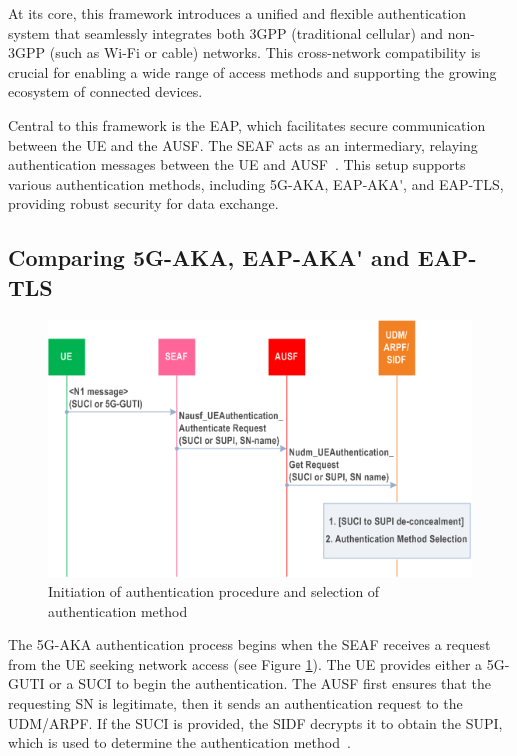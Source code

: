 At its core, this framework introduces a unified and flexible authentication system that seamlessly integrates both \ac{3GPP} (traditional cellular) and non-\ac{3GPP} (such as Wi-Fi or cable) networks. This cross-network compatibility is crucial for enabling a wide range of access methods and supporting the growing ecosystem of connected devices.

Central to this framework is the \ac{EAP}, which facilitates secure communication between the \ac{UE} and the \ac{AUSF}. The \ac{SEAF} acts as an intermediary, relaying authentication messages between the \ac{UE} and \ac{AUSF}~\cite{33.501-p46}. This setup supports various authentication methods, including \ac{5G-AKA}, \ac{EAP-AKA'}, and \ac{EAP-TLS}, providing robust security for data exchange.

\subsection{Comparing \acs{5G-AKA}, \acs{EAP-AKA'} and \acs{EAP-TLS}}

\begin{figure}
    \centering
    \includegraphics[width=0.75\linewidth]{figs/Initiation of authentication procedure and selection of authentication method.png}
    \caption{Initiation of authentication procedure and selection of authentication method}
    \label{fig:Initiation of authentication procedure and selection of authentication method}
\end{figure}

The \ac{5G-AKA} authentication process begins when the \ac{SEAF} receives a request from the \ac{UE} seeking network access (see Figure \ref{fig:Initiation of authentication procedure and selection of authentication method}). The \ac{UE} provides either a \acf{5G-GUTI} or a \ac{SUCI} to begin the authentication. The \ac{AUSF} first ensures that the requesting \ac{SN} is legitimate, then it sends an authentication request to the \ac{UDM}/\ac{ARPF}. If the \ac{SUCI} is provided, the \ac{SIDF} decrypts it to obtain the \ac{SUPI}, which is used to determine the authentication method~\cite{33.501-p48}.

